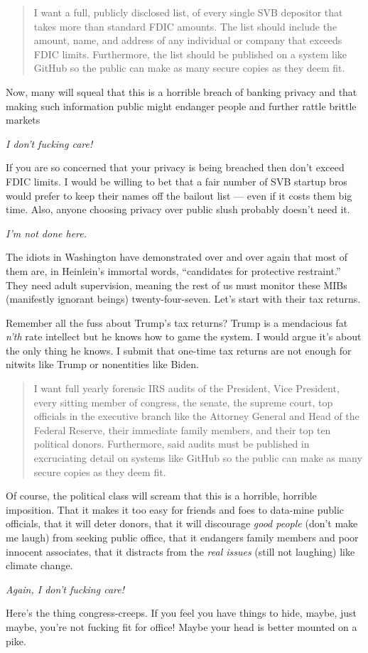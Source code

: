 \begin{quote}
I want a full, publicly disclosed list, of every single SVB depositor
that takes more than standard FDIC amounts. The list should include the
amount, name, and address of any individual or company that exceeds FDIC
limits. Furthermore, the list should be published on a system like
GitHub so the public can make as many secure copies as they deem
fit.
\end{quote}

Now, many will squeal that this is a horrible breach of banking privacy
and that making such information public might endanger people and
further rattle brittle markets

\emph{I don't fucking care!}

If you are so concerned that your privacy is being breached then don't
exceed FDIC limits. I would be willing to bet that a fair number of SVB
startup bros would prefer to keep their names off the bailout list ---
even if it costs them big time. Also, anyone choosing privacy over
public slush probably doesn't need it.

\emph{I'm not done here.}

The idiots in Washington have demonstrated over and over again that most
of them are, in Heinlein's immortal words, ``candidates for protective
restraint.'' They need adult supervision, meaning the rest of us must
monitor these MIBs (manifestly ignorant beings) twenty-four-seven. Let's
start with their tax returns.

Remember all the fuss about Trump's tax returns? Trump is a mendacious
fat \emph{n'th} rate intellect but he knows how to game the system. I would
argue it's about the only thing he knows. I submit that one-time tax
returns are not enough for nitwits like Trump or nonentities like Biden.

\begin{quote}
I want full yearly forensic IRS audits of the President, Vice
President, every sitting member of congress, the senate, the supreme
court, top officials in the executive branch like the Attorney General
and Head of the Federal Reserve, their immediate family members, and
their top ten political donors. Furthermore, said audits must be
published in excruciating detail on systems like GitHub so the public
can make as many secure copies as they deem fit.
\end{quote}

Of course, the political class will scream that this is a horrible,
horrible imposition. That it makes it too easy for friends and foes to
data-mine public officials, that it will deter donors, that it will
discourage \emph{good people} (don't make me laugh) from seeking public
office, that it endangers family members and poor innocent associates,
that it distracts from the \emph{real issues} (still not laughing) like
climate change.

\emph{Again, I don't fucking care!}

Here's the thing congress-creeps. If you feel you have things to hide,
maybe, just maybe, you're not fucking fit for office! Maybe your head is
better mounted on a pike.



%
 
